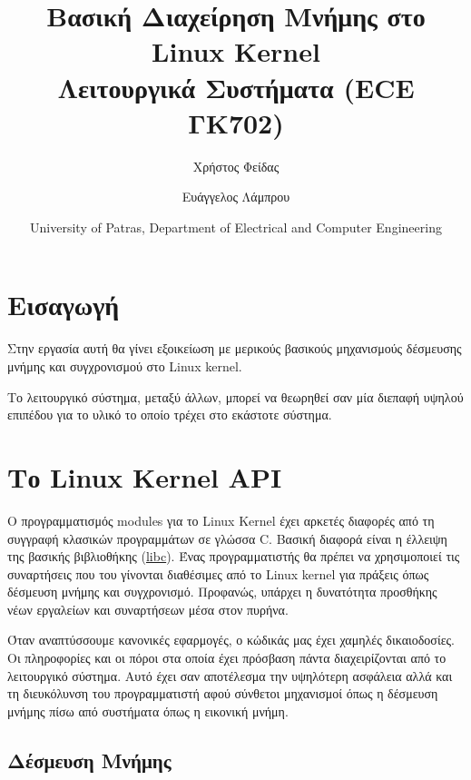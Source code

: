 \documentclass[18pt]{extarticle}
\title{Βασική Διαχείρηση Μνήμης στο Linux Kernel \\Λειτουργικά Συστήματα (ECE ΓΚ702)} %
\author{\footnotesize Χρήστος Φείδας\\ \footnotesize \src{fidas@upatras.gr} \and \footnotesize Ευάγγελος Λάμπρου\\ \footnotesize \src{e.lamprou@upnet.gr}} %
\author{}
\date{University of Patras, Department of Electrical and Computer Engineering} %
\begin{document}
\pagestyle{fancy} 
\fancyhf{} %
\renewcommand{\headrulewidth}{0pt}
\fancyhead{} %
\fancyfoot{} %
\fancyfoot[R]{\thepage}

\maketitle


\section{Εισαγωγή}

Στην εργασία αυτή θα γίνει εξοικείωση με μερικούς βασικούς μηχανισμούς δέσμευσης μνήμης και συγχρονισμού στο Linux kernel.

Το λειτουργικό σύστημα, μεταξύ άλλων, μπορεί να θεωρηθεί σαν μία διεπαφή υψηλού επιπέδου για το υλικό το οποίο τρέχει στο εκάστοτε σύστημα.

\section{Το Linux Kernel API}

Ο προγραμματισμός modules για το Linux Kernel έχει αρκετές διαφορές από τη συγγραφή κλασικών προγραμμάτων σε γλώσσα C.
Βασική διαφορά είναι η έλλειψη της βασικής βιβλιοθήκης (\href{https://man7.org/linux/man-pages/man7/libc.7.html}{libc}). 
Ένας προγραμματιστής θα πρέπει να χρησιμοποιεί τις συναρτήσεις που του γίνονται διαθέσιμες από το Linux kernel για πράξεις όπως δέσμευση μνήμης και συγχρονισμό.
Προφανώς, υπάρχει η δυνατότητα προσθήκης νέων εργαλείων και συναρτήσεων μέσα στον πυρήνα.

Όταν αναπτύσσουμε κανονικές εφαρμογές, ο κώδικάς μας έχει χαμηλές δικαιοδοσίες.
Οι πληροφορίες και οι πόροι στα οποία έχει πρόσβαση πάντα διαχειρίζονται από το λειτουργικό σύστημα.
Αυτό έχει σαν αποτέλεσμα την υψηλότερη ασφάλεια αλλά και τη διευκόλυνση του προγραμματιστή αφού 
σύνθετοι μηχανισμοί όπως η δέσμευση μνήμης  πίσω από συστήματα όπως η εικονική μνήμη.

\subsection{Δέσμευση Μνήμης}
\end{document}
